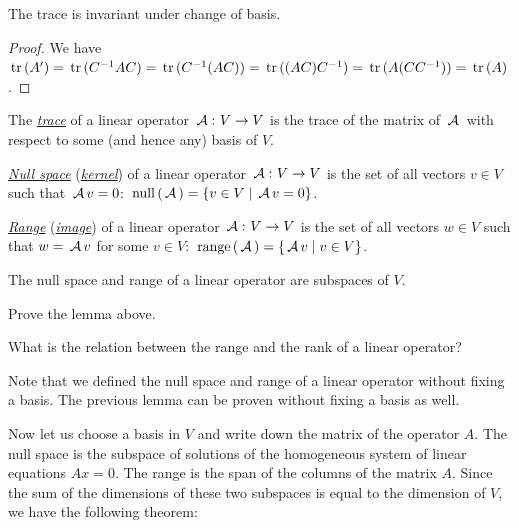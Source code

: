 \begin{corollary}
The trace is invariant under change of basis.
\end{corollary}

\begin{proof}
We have $\,\mathrm{tr}\,(A') = \,\mathrm{tr}\,(C^{-1} A C) = \,\mathrm{tr}\,(C^{-1}(A C)) = \,\mathrm{tr}\,((AC)C^{-1}) = \,\mathrm{tr}\,(A(C C^{-1})) = \,\mathrm{tr}\,(A)$.
\end{proof}

\begin{definition}
The \underline{\it trace} of a linear operator $\,\mathcal{A}\,\colon V \to V$ is the trace of the matrix of $\,\mathcal{A}\,$ with respect to some (and hence any) basis of $V$.
\end{definition}

\begin{definition}
\underline{\it Null space} (\underline{\it kernel}) of a linear operator $\,\mathcal{A}\,\colon V \to V$ is the set of all vectors $v \in V$ such that $\,\mathcal{A}\, v = 0$: $\,\mathrm{null}\,(\,\mathcal{A}\,) = \{v \in V \mid \,\mathcal{A}\, v = 0\}$.
\end{definition}

\begin{definition}
\underline{\it Range} (\underline{\it image}) of a linear operator $\,\mathcal{A}\,\colon V \to V$ is the set of all vectors $w \in V$ such that $w = \,\mathcal{A}\, v$ for some $v \in V$: $\,\mathrm{range}\,(\,\mathcal{A}\,) = \{\,\mathcal{A}\, v \mid  v \in V\}$.
\end{definition}

\begin{lemma}
The null space and range of a linear operator are subspaces of $V$.
\end{lemma}

\begin{exercise}
Prove the lemma above.
\end{exercise}

\begin{exercise}
What is the relation between the range and the rank of a linear operator?
\end{exercise}

\begin{remark}
Note that we defined the null space and range of a linear operator without fixing a basis. The previous lemma can be proven without fixing a basis as well.
\end{remark}

Now let us choose a basis in $V$ and write down the matrix of the operator $A$. The null space is the subspace of solutions of the homogeneous system of linear equations $A x = 0$. The range is the span of the columns of the matrix $A$. Since the sum of the dimensions of these two subspaces is equal to the dimension of $V$, we have the following theorem:

